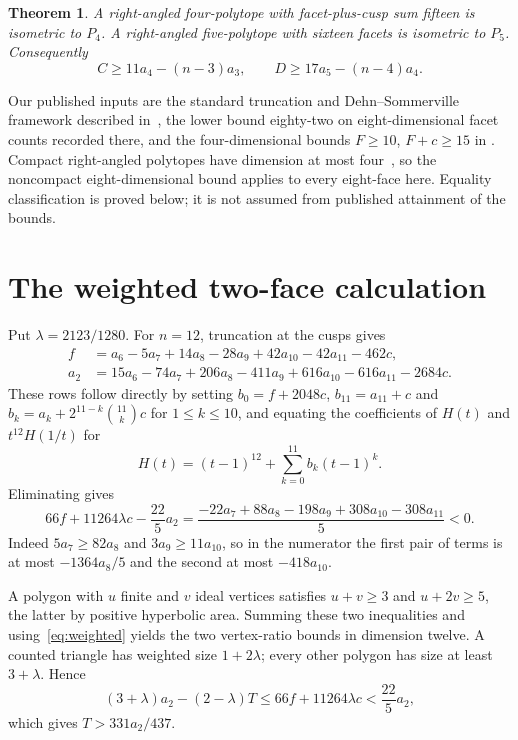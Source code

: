 \documentclass[11pt]{article}
\newtheorem{theorem}{Theorem}
\begin{document}
\begin{theorem}\label{thm:rigid}
A right-angled four-polytope with facet-plus-cusp sum fifteen is
isometric to $P_4$. A right-angled five-polytope with sixteen facets
is isometric to $P_5$. Consequently
\[
 C\ge 11a_4-(n-3)a_3,\qquad
 D\ge 17a_5-(n-4)a_4.
\]
\end{theorem}

Our published inputs are the standard truncation and
Dehn--Sommerville framework described in~\cite{Alex}, the lower bound
eighty-two on eight-dimensional facet counts recorded there, and the
four-dimensional bounds $F\ge10$, $F+c\ge15$ in
\cite[Section~4, equations~(7)--(8)]{PV}. Compact right-angled polytopes
have dimension at most four~\cite{PV}, so the noncompact eight-dimensional
bound applies to every eight-face here. Equality classification is
proved below; it is not assumed from published attainment of the bounds.

\section{The weighted two-face calculation}
Put $\lambda=2123/1280$. For $n=12$, truncation at the cusps gives
\begin{align*}
 f&=a_6-5a_7+14a_8-28a_9+42a_{10}-42a_{11}-462c,\\
 a_2&=15a_6-74a_7+206a_8-411a_9+616a_{10}-616a_{11}-2684c.
\end{align*}
These rows follow directly by setting $b_0=f+2048c$, $b_{11}=a_{11}+c$
and $b_k=a_k+2^{11-k}\binom{11}{k}c$ for $1\le k\le10$, and equating
the coefficients of $H(t)$ and $t^{12}H(1/t)$ for
\[
 H(t)=(t-1)^{12}+\sum_{k=0}^{11}b_k(t-1)^k.
\]
Eliminating gives
\begin{equation}\label{eq:weighted}
 66f+11264\lambda c-\frac{22}{5}a_2
 =\frac{-22a_7+88a_8-198a_9+308a_{10}-308a_{11}}5<0.
\end{equation}
Indeed $5a_7\ge82a_8$ and $3a_9\ge11a_{10}$, so in the numerator
the first pair of terms is at most $-1364a_8/5$ and the second at most
$-418a_{10}$.

A polygon with $u$ finite and $v$ ideal vertices satisfies
$u+v\ge3$ and $u+2v\ge5$, the latter by positive hyperbolic area.
Summing these two inequalities and using~\eqref{eq:weighted} yields
the two vertex-ratio bounds in dimension twelve. A counted triangle
has weighted size $1+2\lambda$; every other polygon has size at least
$3+\lambda$. Hence
\[
 (3+\lambda)a_2-(2-\lambda)T
 \le66f+11264\lambda c<\frac{22}{5}a_2,
\]
which gives $T>331a_2/437$.
\end{document}
